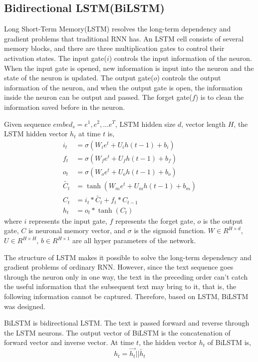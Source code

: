 \documentclass[a4paper,10pt]{article}
\begin{document}
\subsection{Bidirectional LSTM(BiLSTM)}
\par Long Short-Term Memory(LSTM) resolves the long-term dependency and gradient problems that traditional RNN has. An LSTM cell consists of several memory blocks, and there are three multiplication gates to control their activation states. The input gate($i$) controls the input information of the neuron. When the input gate is opened, new information is input into the neuron and the state of the neuron is updated. The output gate($o$) controls the output information of the neuron, and when the output gate is open, the information inside the neuron can be output and passed. The forget gate($f$) is to clean the information saved before in the neuron.
\par Given sequence $embed_s={e^1,e^2,...e^T}$, LSTM hidden size $d$, vector length $H$, the LSTM hidden vector $h_t$ at time $t$ is,
\begin{equation}
\begin{aligned}
i_t &= \sigma(W_i e^t + U_i h(t-1) + b_i) \\
f_t &= \sigma(W_f e^t + U_f h(t-1) + b_f) \\
o_t &= \sigma(W_o e^t + U_o h(t-1) + b_o) \\
\widetilde{C_t} &= \tanh(W_m e^t + U_m h(t-1) + b_m) \\
C_t &= i_t *\widetilde{C_t} + f_t * C_{t-1} \\
h_t &= o_t * \tanh(C_t)
\end{aligned}
\end{equation}
where $i$ represents the input gate, $f$ represents the forget gate, $o$ is the output gate, $C$ is neuronal memory vector, and $\sigma$ is the sigmoid function. $W\in R^{H \times d}$, $U \in R^{H \times H}$, $b\in R^{H \times 1}$ are all hyper parameters of the network.
\par The structure of LSTM makes it possible to solve the long-term dependency and gradient problems of ordinary RNN. However, since the text sequence goes through the neuron only in one way, the text in the preceding order can't catch the useful information that the subsequent text may bring to it, that is, the following information cannot be captured. Therefore, based on LSTM, BiLSTM was designed.
\par BiLSTM is bidirectional LSTM. The text is passed forward and reverse through the LSTM neurons. The output vector of BiLSTM is the concatenation of forward vector and inverse vector. At time $t$, the hidden vector $h_t$ of BiLSTM is,
\begin{equation}
h_t = \overrightarrow{h_t} || \overleftarrow{h_t}
\end{equation}
\end{document}
